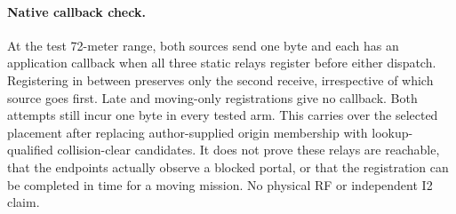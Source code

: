 \documentclass{article}
\begin{document}
\paragraph{Native callback check.}
At the test 72-meter range, both sources send one byte and each
has an application callback when all three static relays register
before either dispatch. Registering in between preserves only the
second receive, irrespective of which source goes first. Late and
moving-only registrations give no callback. Both attempts still
incur one byte in every tested arm. This carries over the selected
placement after replacing author-supplied origin membership with
lookup-qualified collision-clear candidates. It does not prove
these relays are reachable, that the endpoints actually observe a
blocked portal, or that the registration can be completed in time
for a moving mission. No physical RF or independent I2 claim.
\end{document}
